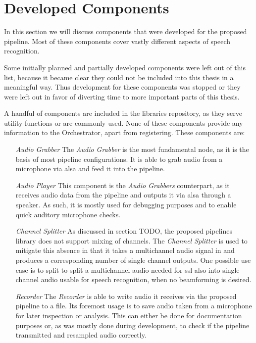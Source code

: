 
\section{Developed Components}
\label{main:components:start}
In this section we will discuss components that were developed for the proposed pipeline.
Most of these components cover vastly different aspects of speech recognition.

Some initially planned and partially developed components were left out of this list, because it became clear they could not be included into this thesis in a meaningful way.
Thus development for these components was stopped or they were left out in favor of diverting time to more important parts of this thesis.


A handful of components are included in the libraries repository, as they serve utility functions or are commonly used.
None of these components provide any information to the Orchestrator, apart from registering.
These components are:
\begin{itemize}[leftmargin=1in]
	\item[\textit{Audio Grabber}] The \textit{Audio Grabber} is the most fundamental node, as it is the basis of most pipeline configurations.
	It is able to grab audio from a microphone via \gls{alsa} and feed it into the pipeline.

	\item[\textit{Audio Player}] This component is the \textit{Audio Grabbers} counterpart, as it receives audio data from the pipeline and outputs it via \gls{alsa} through a speaker.
	As such, it is mostly used for debugging purposes and to enable quick auditory microphone checks.

	\item[\textit{Channel Splitter}] As discussed in section TODO, the proposed pipelines library does not support mixing of channels.%
	The \textit{Channel Splitter} is used to mitigate this absence in that it takes a multichannel audio signal in and produces a corresponding number of single channel outputs.
	One possible use case is to split to split a multichannel audio needed for \gls{ssl} also into single channel audio usable for speech recognition, when no beamforming is desired.

	\item[\textit{Recorder}] The \textit{Recorder} is able to write audio it receives via the proposed pipeline to a file.
	Its foremost usage is to save audio taken from a microphone for later inspection or analysis.
	This can either be done for documentation purposes or, as was mostly done during development, to check if the pipeline transmitted and resampled audio correctly.
\end{itemize}

